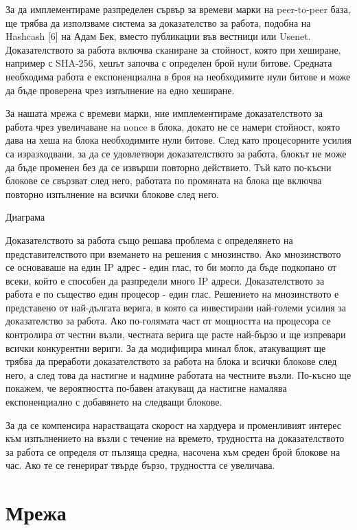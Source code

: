 \documentclass[11pt,a4paper]{article}
\begin{document}
За да имплементираме разпределен сървър за времеви марки на peer-to-peer база, ще трябва да използваме система за доказателство за работа, подобна на Hashcash [6] на Адам Бек, вместо публикации във вестници или Usenet. Доказателството за работа включва сканиране за стойност, която при хеширане, например с SHA-256, хешът започва с определен брой нули битове. Средната необходима работа е експоненциална в броя на необходимите нули битове и може да бъде проверена чрез изпълнение на едно хеширане.

За нашата мрежа с времеви марки, ние имплементираме доказателството за работа чрез увеличаване на nonce в блока, докато не се намери стойност, която дава на хеша на блока необходимите нули битове. След като процесорните усилия са изразходвани, за да се удовлетвори доказателството за работа, блокът не може да бъде променен без да се извърши повторно действието. Тъй като по-късни блокове се свързват след него, работата по промяната на блока ще включва повторно изпълнение на всички блокове след него.

Диаграма

Доказателството за работа също решава проблема с определянето на представителството при вземането на решения с мнозинство. Ако мнозинството се основаваше на един IP адрес - един глас, то би могло да бъде подкопано от всеки, който е способен да разпредели много IP адреси. Доказателството за работа е по същество един процесор - един глас. Решението на мнозинството е представено от най-дългата верига, в която са инвестирани най-големи усилия за доказателство за работа. Ако по-голямата част от мощността на процесора се контролира от честни възли, честната верига ще расте най-бързо и ще изпревари всички конкурентни вериги. За да модифицира минал блок, атакуващият ще трябва да преработи доказателството за работа на блока и всички блокове след него, а след това да настигне и надмине работата на честните възли. По-късно ще покажем, че вероятността по-бавен атакуващ да настигне намалява експоненциално с добавянето на следващи блокове.

За да се компенсира нарастващата скорост на хардуера и променливият интерес към изпълнението на възли с течение на времето, трудността на доказателството за работа се определя от пълзяща средна, насочена към среден брой блокове на час. Ако те се генерират твърде бързо, трудността се увеличава.

\section{Мрежа}
\end{document}
